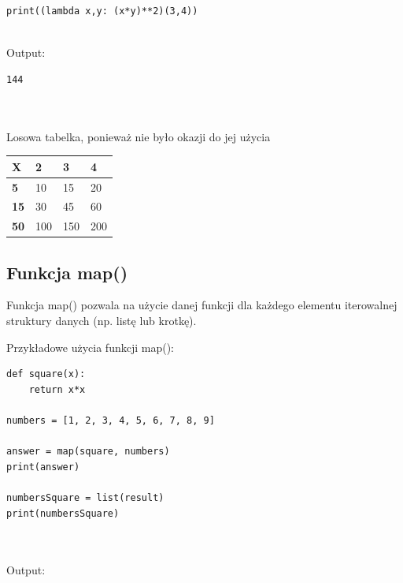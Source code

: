 \documentclass[a4paper, 12pt]{article}
\begin{document}
\noindent\begin{minipage}{\linewidth}
\begin{lstlisting}[style=python]
print((lambda x,y: (x*y)**2)(3,4))
\end{lstlisting}
\end{minipage}
\\
Output:


\noindent\begin{minipage}{\linewidth}
\begin{lstlisting}[style=python]
144
\end{lstlisting}
\end{minipage}
\\ \\ 

Losowa tabelka, ponieważ nie było okazji do jej użycia
\begin{table}[!ht]
    \centering
    \begin{tabular}{|l|l|l|l|}
    \hline
        \textbf{X} & \textbf{2} & \textbf{3} & \textbf{4} \\ \hline
        \textbf{5} & 10 & 15 & 20 \\ \hline
        \textbf{15} & 30 & 45 & 60 \\ \hline
        \textbf{50} & 100 & 150 & 200 \\ \hline
    \end{tabular}
\end{table}




\pagebreak

\subsection{Funkcja map()}
Funkcja map() pozwala na użycie danej funkcji dla każdego elementu iterowalnej struktury danych (np. listę lub krotkę).


Przykładowe użycia funkcji map():

\noindent\begin{minipage}{\linewidth}
\begin{lstlisting}[style=python]
def square(x):
    return x*x
    
numbers = [1, 2, 3, 4, 5, 6, 7, 8, 9]

answer = map(square, numbers)
print(answer)

numbersSquare = list(result)
print(numbersSquare)
\end{lstlisting}
\end{minipage}
\\ \\
Output:
\end{document}
